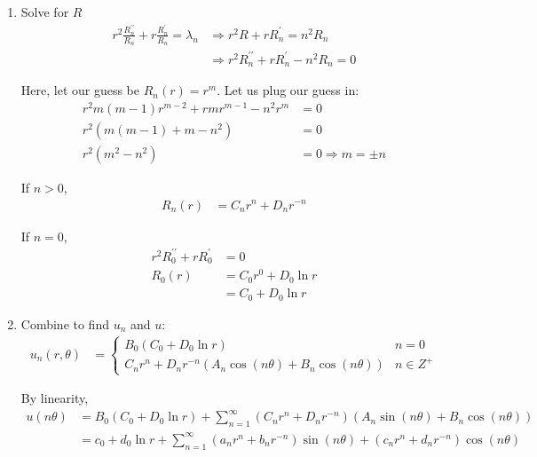 \begin{enumerate}
  \item Solve for $R$
  \begin{align}
    r^2 \frac{R^{\prime\prime}_n}{R_n} + r \frac{R^\prime_n}{R_n} = \lambda_n & \Rightarrow r^2 R + rR^\prime_n = n^2 R_n\\
    & \Rightarrow r^2 R^{\prime\prime}_n + rR^\prime_n - n^2 R_n = 0
  \end{align}

  Here, let our guess be $R_n(r) = r^m$. Let us plug our guess in:
  \begin{align}
    r^2 m(m - 1)r^{m - 2} + r mr^{m - 1} - n^2 r^m & = 0\\
    r^2 \left( m(m - 1) + m - n^2 \right) & = 0\\
    r^2 \left( m^2 - n^2 \right) & = 0 \Rightarrow m = \pm n
  \end{align}

  If $n > 0$,
  \begin{align}
    R_n(r) & = C_nr^n + D_nr^{-n}
  \end{align}

  If $n = 0$,
  \begin{align}
    r^2R^{\prime\prime}_0 + rR^\prime_0 & = 0\\
    R_0(r) & = C_0 r^0 + D_0 \ln r\\
    & = C_0 + D_0 \ln r
  \end{align}
  \item Combine to find $u_n$ and $u$:
  \begin{align}
    u_n(r, \theta) & =
    \begin{cases}
      B_0( C_0 + D_0 \ln r) & n = 0\\
      C_nr^n + D_n r^{-n}\left(A_n \cos(n \theta) + B_n \cos(n \theta) \right) & n \in Z^+
    \end{cases}
  \end{align}

  By linearity,
  \begin{align}
    u(n \theta) & = B_0(C_0 + D_0 \ln r) + \sum^\infty_{n = 1} \left(C_n r^n + D_n r^{-n}\right) \left( A_n \sin(n \theta) + B_n \cos(n \theta) \right)\\
    & = c_0 + d_0 \ln r + \sum^\infty_{n = 1} (a_nr^n + b_nr^{-n}) \sin(n \theta) + (c_nr^n + d_nr^{-n}) \cos(n \theta)
  \end{align}
\end{enumerate}


